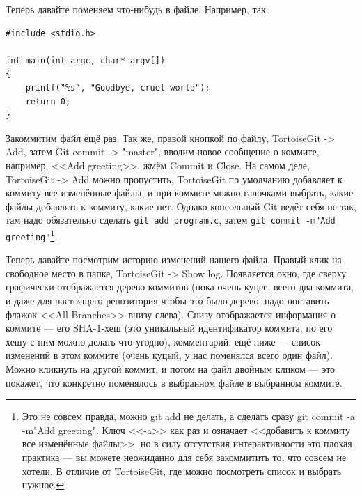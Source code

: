 \documentclass{../../text-style}
\begin{document}
Теперь давайте поменяем что-нибудь в файле. Например, так:

\begin{verbatim}
#include <stdio.h>

int main(int argc, char* argv[])
{
    printf("%s", "Goodbye, cruel world");
    return 0;
}
\end{verbatim}

Закоммитим файл ещё раз. Так же, правой кнопкой по файлу, TortoiseGit -> Add, затем Git commit -> "master", вводим новое сообщение о коммите, например, <<Add greeting>>, жмём Commit и Close. На самом деле, TortoiseGit -> Add можно пропустить, TortoiseGit по умолчанию добавляет к коммиту все изменённые файлы, и при коммите можно галочками выбрать, какие файлы добавлять к коммиту, какие нет. Однако консольный Git ведёт себя не так, там надо обязательно сделать \verb|git add program.c|, затем \verb|git commit -m"Add greeting"|\footnote{Это не совсем правда, можно git add не делать, а сделать сразу git commit -a -m"Add greeting". Ключ <<-a>> как раз и означает <<добавить к коммиту все изменённые файлы>>, но в силу отсутствия интерактивности это плохая практика --- вы можете неожиданно для себя закоммитить то, что совсем не хотели. В отличие от TortoiseGit, где можно посмотреть список и выбрать нужное.}.

Теперь давайте посмотрим историю изменений нашего файла. Правый клик на свободное место в папке, TortoiseGit -> Show log. Появляется окно, где сверху графически отображается дерево коммитов (пока очень куцее, всего два коммита, и даже для настоящего репозитория чтобы это было дерево, надо поставить флажок <<All Branches>> внизу слева). Снизу отображается информация о коммите --- его SHA-1-хеш (это уникальный идентификатор коммита, по его хешу с ним можно делать что угодно), комментарий, ещё ниже --- список изменений в этом коммите (очень куцый, у нас поменялся всего один файл). Можно кликнуть на другой коммит, и потом на файл двойным кликом --- это покажет, что конкретно поменялось в выбранном файле в выбранном коммите.
\end{document}
